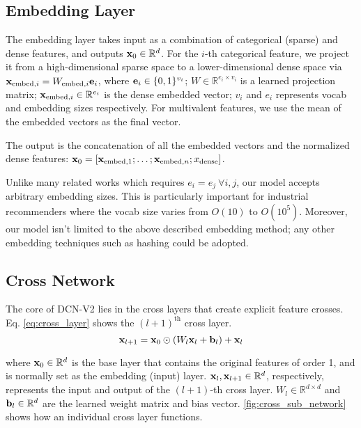 \documentclass[sigconf]{acmart}
\newcommand{\vecx}{{\bf x}}
\newcommand{\vecb}{{\bf b}}
\newcommand{\vece}{{\bf e}}
\begin{document}
\subsection{Embedding Layer}

The embedding layer takes input as a combination of categorical (sparse) and dense features, and outputs $\vecx_0 \in \mathbb{R}^d$. For the $i$-th categorical feature, we project it from a high-dimensional sparse space to a lower-dimensional dense space via
$\vecx_{\text{embed}, i} = W_{\text{embed},i} \vece_i$,
where $\vece_i \in \{0, 1\}^{v_i}$; $W \in \mathbb{R}^{e_i \times v_i}$ is a learned projection matrix; $\vecx_{\text{embed}, i} \in \mathbb{R}^{e_i}$ is the dense embedded vector; $v_i$ and $e_i$ represents vocab and embedding sizes respectively. For multivalent features, we use the mean of the embedded vectors as the final vector. 

The output is the concatenation of all the embedded vectors and the normalized dense features:
$\vecx_0 = [\vecx_{\text{embed}, 1}; \ldots; \vecx_{\text{embed}, n}; x_{\text{dense}}]$.


Unlike many related works \cite{song2019autoint, lian2018xdeepfm, qu2016product, guo2017deepfm, naumov2019deep, he2017neural} which requires $e_i=e_j~\forall i, j$, our model accepts arbitrary embedding sizes. This is particularly important for industrial recommenders where the vocab size varies from $O(10)$ to $O(10^5)$. Moreover, our model isn't limited to the above described embedding method; any other embedding techniques such as hashing could be adopted. 

\subsection{Cross Network}
The core of {DCN-V2} lies in the cross layers that create explicit feature crosses. Eq. \eqref{eq:cross_layer} shows the $(l+1)^\text{th}$ cross layer.
\begin{equation}
\label{eq:cross_layer}
	\vecx_{l+1} =\vecx_0 \odot (W_l \vecx_l +  \vecb_l) + \vecx_l
\end{equation}

where $\vecx_0 \in \mathbb{R}^{d}$ is the base layer that contains the original features of order 1, and is normally set as the embedding (input) layer. $\vecx_l,\vecx_{l+1} \in \mathbb{R}^{d}$, respectively, represents the input and output of the  $(l+1)$-th cross layer. $W_l \in \mathbb{R}^{d \times d}$ and $\vecb_l \in \mathbb{R}^{d}$ are the learned weight matrix and bias vector. \autoref{fig:cross_sub_network} shows how an individual cross layer functions.
\end{document}
